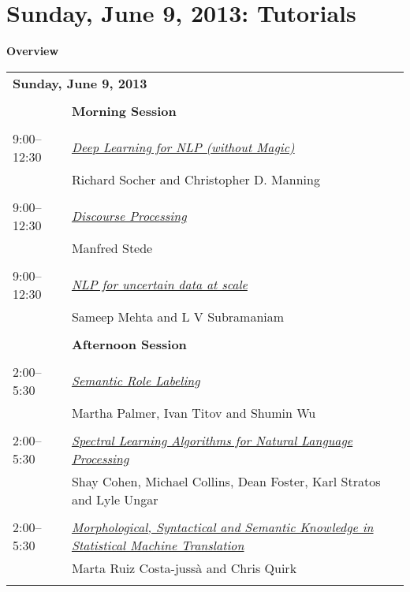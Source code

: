 \chapter{Sunday, June 9, 2013: Tutorials}
\thispagestyle{emptyheader}
\vspace{-3em}
\sloppy
\setlength{\parindent}{0in}
\setlength{\parskip}{2ex}
\renewcommand{\baselinestretch}{0.87}

\begin{center}
{\Large \bf
  Overview
}
\end{center}
\vspace{3mm}
\begin{tabular}{p{20mm}p{128mm}}
\multicolumn{2}{l}{\bf Sunday, June 9, 2013} \\
\\
 & {\bf Morning Session} \\
\\
9:00--12:30 & \hyperlink{page.1}{\em Deep Learning for NLP (without Magic)}\\
         & Richard Socher and Christopher D. Manning \\
\\

9:00--12:30 & \hyperlink{page.4}{\em Discourse Processing}\\
         & Manfred Stede \\
\\

9:00--12:30 & \hyperlink{page.7}{\em NLP for uncertain data at scale}\\
         & Sameep Mehta and L V Subramaniam \\
\\

 & {\bf Afternoon Session} \\
\\
2:00--5:30 & \hyperlink{page.10}{\em Semantic Role Labeling}\\
         & Martha Palmer, Ivan Titov and Shumin Wu \\
\\

2:00--5:30 & \hyperlink{page.13}{\em Spectral Learning Algorithms for Natural Language Processing}\\
         & Shay Cohen, Michael Collins, Dean Foster, Karl Stratos and Lyle Ungar \\
\\

2:00--5:30 & \hyperlink{page.16}{\em Morphological, Syntactical and Semantic Knowledge in Statistical Machine Translation}\\
         & Marta Ruiz Costa-juss\`{a} and Chris Quirk \\
\\

\end{tabular}

\clearpage
\clearpage
\clearpage
\clearpage
\clearpage
\clearpage

